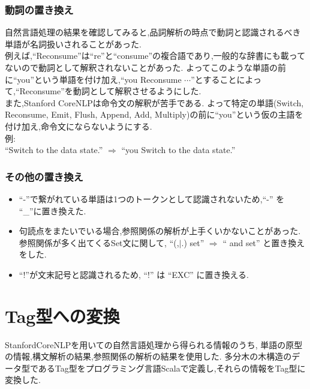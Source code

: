 \documentclass[uplatex,a4j]{jsreport}
\begin{document}
\subsubsection*{動詞の置き換え}
%
自然言語処理の結果を確認してみると,品詞解析の時点で動詞と認識されるべき単語が名詞扱いされることがあった.\\
例えば,``Reconsume''は``re''と``consume''の複合語であり,一般的な辞書にも載ってないので動詞として解釈されないことがあった.
よってこのような単語の前に``you''という単語を付け加え,``you Reconsume $\cdots$''とすることによって,``Reconsume''を動詞として解釈させるようにした.\\
また,Stanford CoreNLPは命令文の解釈が苦手である.
よって特定の単語(Switch, Reconsume, Emit, Flush, Append, Add, Multiply)の前に``you''という仮の主語を付け加え,命令文にならないようにする.\\
例:\\
“Switch to the data state.” $\Rightarrow$ “you Switch to the data state.”
\subsubsection*{その他の置き換え}
\begin{itemize}
   \item ``-''で繋がれている単語は1つのトークンとして認識されないため,“-” を “_”に置き換えた.
   \item 句読点をまたいでいる場合,参照関係の解析が上手くいかないことがあった.参照関係が多く出てくるSet文に関して, 
   ``(,$|$.) set'' $\Rightarrow$ “ and set” と置き換えをした.
   \item “!”が文末記号と認識されるため, “!” は “EXC” に置き換える.
 \end{itemize}

\section{Tag型への変換}
StanfordCoreNLPを用いての自然言語処理から得られる情報のうち,
単語の原型の情報,構文解析の結果,参照関係の解析の結果を使用した.
多分木の木構造のデータ型であるTag型をプログラミング言語Scalaで定義し,それらの情報をTag型に変換した.\\
\end{document}
